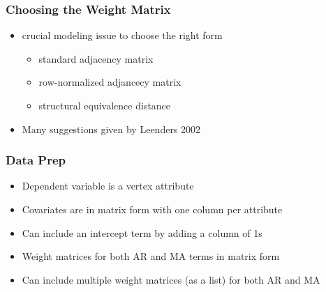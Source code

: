 \documentclass{beamer}
\begin{document}
\begin{frame}
\frametitle{Choosing the Weight Matrix}
\begin{itemize}
\pause
\item crucial modeling issue to choose the right form
\begin{itemize}
\pause
\item standard adjacency matrix
\pause
\item row-normalized adjancecy matrix
\pause
\item structural equivalence distance
\end{itemize}
\pause
\item Many suggestions given by Leenders 2002
\end{itemize}
\end{frame}
\begin{frame}
\frametitle{Data Prep}
\begin{itemize}
\pause
\item Dependent variable is a vertex attribute
\pause
\item Covariates are in matrix form with one column per attribute
\pause
\item Can include an intercept term by adding a column of 1s
\pause
\item Weight matrices for both AR and MA terms in matrix form
\pause
\item Can include multiple weight matrices (as a list) for both AR and MA
\end{itemize}
\end{frame}
\end{document}
